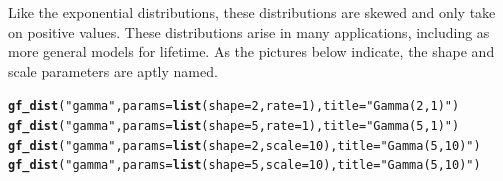 \documentclass[twoside]{book}\usepackage[]{graphicx}\usepackage[]{xcolor}
\makeatletter
\newcommand{\hlnum}[1]{\textcolor[rgb]{0.686,0.059,0.569}{#1}}%
\newcommand{\hlstr}[1]{\textcolor[rgb]{0.192,0.494,0.8}{#1}}%
\newcommand{\hlstd}[1]{\textcolor[rgb]{0.345,0.345,0.345}{#1}}%
\newcommand{\hlkwc}[1]{\textcolor[rgb]{0.333,0.667,0.333}{#1}}%
\newcommand{\hlkwd}[1]{\textcolor[rgb]{0.737,0.353,0.396}{\textbf{#1}}}%
\newenvironment{kframe}{%
 \def\at@end@of@kframe{}%
 \ifinner\ifhmode%
  \def\at@end@of@kframe{\end{minipage}}%
  \begin{minipage}{\columnwidth}%
 \fi\fi%
 \def\FrameCommand##1{\hskip\@totalleftmargin \hskip-\fboxsep
 \colorbox{shadecolor}{##1}\hskip-\fboxsep
     \hskip-\linewidth \hskip-\@totalleftmargin \hskip\columnwidth}%
 \MakeFramed {\advance\hsize-\width
   \@totalleftmargin\z@ \linewidth\hsize
   \@setminipage}}%
 {\par\unskip\endMakeFramed%
 \at@end@of@kframe}
\newenvironment{knitrout}{}{} %
\makeatother
\begin{document}
Like the exponential distributions, these distributions are skewed and only take 
on positive values.  
These distributions arise in many applications, including as more general models 
for lifetime.  As the pictures below indicate, the shape and scale parameters
are aptly named.

\begin{knitrout}
\color{fgcolor}\begin{kframe}
\begin{alltt}
\hlkwd{gf_dist}\hlstd{(}\hlstr{"gamma"}\hlstd{,} \hlkwc{params} \hlstd{=} \hlkwd{list}\hlstd{(}\hlkwc{shape} \hlstd{=} \hlnum{2}\hlstd{,} \hlkwc{rate} \hlstd{=} \hlnum{1}\hlstd{),} \hlkwc{title} \hlstd{=} \hlstr{"Gamma(2,1)"}\hlstd{)}
\hlkwd{gf_dist}\hlstd{(}\hlstr{"gamma"}\hlstd{,} \hlkwc{params} \hlstd{=} \hlkwd{list}\hlstd{(}\hlkwc{shape} \hlstd{=} \hlnum{5}\hlstd{,} \hlkwc{rate} \hlstd{=} \hlnum{1}\hlstd{),} \hlkwc{title} \hlstd{=} \hlstr{"Gamma(5,1)"}\hlstd{)}
\hlkwd{gf_dist}\hlstd{(}\hlstr{"gamma"}\hlstd{,} \hlkwc{params} \hlstd{=} \hlkwd{list}\hlstd{(}\hlkwc{shape} \hlstd{=} \hlnum{2}\hlstd{,} \hlkwc{scale} \hlstd{=} \hlnum{10}\hlstd{),} \hlkwc{title} \hlstd{=} \hlstr{"Gamma(5,10)"}\hlstd{)}
\hlkwd{gf_dist}\hlstd{(}\hlstr{"gamma"}\hlstd{,} \hlkwc{params} \hlstd{=} \hlkwd{list}\hlstd{(}\hlkwc{shape} \hlstd{=} \hlnum{5}\hlstd{,} \hlkwc{scale} \hlstd{=} \hlnum{10}\hlstd{),} \hlkwc{title} \hlstd{=} \hlstr{"Gamma(5,10)"}\hlstd{)}
\end{alltt}
\end{kframe}


\end{knitrout}
\end{document}
